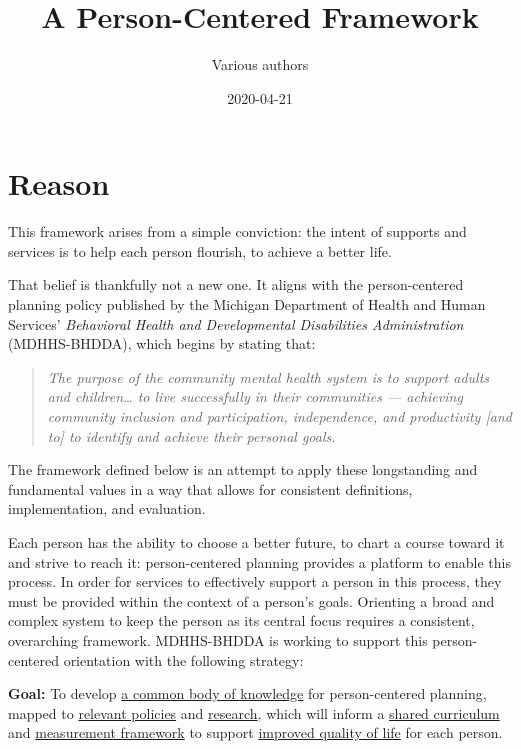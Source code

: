 \documentclass[
]{book}
\title{A Person-Centered Framework}
\author{Various authors}
\date{2020-04-21}
\begin{document}
\maketitle

{
\setcounter{tocdepth}{1}
\tableofcontents
}
\hypertarget{reason}{%
\chapter{Reason}\label{reason}}

This framework arises from a simple conviction: the intent of supports and services is to help each person flourish, to achieve a better life.

That belief is thankfully not a new one. It aligns with the person-centered planning policy\citep{pcp-policy} published by the Michigan Department of Health and Human Services' \emph{Behavioral Health and Developmental Disabilities Administration} (MDHHS-BHDDA), which begins by stating that:

\begin{quote}
\emph{The purpose of the community mental health system is to support adults and children\ldots{} to live successfully in their communities --- achieving community inclusion and participation, independence, and productivity {[}and to{]} to identify and achieve their personal goals.}
\end{quote}

The framework defined below is an attempt to apply these longstanding and fundamental values in a way that allows for consistent definitions, implementation, and evaluation.

Each person has the ability to choose a better future, to chart a course toward it and strive to reach it: person-centered planning provides a platform to enable this process. In order for services to effectively support a person in this process, they must be provided within the context of a person's goals. Orienting a broad and complex system to keep the person as its central focus requires a consistent, overarching framework. MDHHS-BHDDA is working to support this person-centered orientation with the following strategy:

\textbf{Goal:} To develop \protect\hyperlink{bok}{a common body of knowledge} for person-centered planning,
mapped to \protect\hyperlink{policy}{relevant policies} and \protect\hyperlink{research}{research},
which will inform a \protect\hyperlink{curriculum}{shared curriculum}
and \protect\hyperlink{measure}{measurement framework}
to support \protect\hyperlink{pcpdca}{improved quality of life} for each person.
\end{document}
